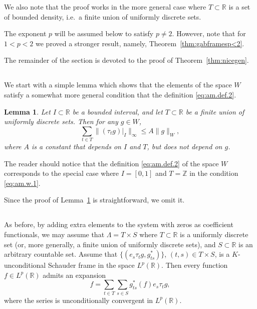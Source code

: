 \documentclass[reqno,a4paper,12pt]{amsart}
\numberwithin{equation}{section}
\numberwithin{figure}{section}
\newcommand\R{\mathbb{R}}
\newcommand\Z{\mathbb{Z}}
\newcommand\1{\mathds{1}}
\newcommand{\TTT}{T}
\newcommand{\SSS}{S}
\newcommand{\ts}{\tau}
\renewcommand\le{\leqslant}
\newcommand\sbt{\subset}
\theoremstyle{plain}
\newtheorem{lem}[thm]{Lemma}
\newcommand{\thmref}[1]{Theorem~\ref{#1}}
\newcommand{\lemref}[1]{Lemma~\ref{#1}}
\theoremstyle{definition}
\begin{document}
We also note that the proof works in the more general case where 
$\TTT \sbt \R$ is a set of bounded density, i.e.\ a finite union of uniformly discrete sets.

The exponent $p$ will be assumed below to satisfy $p \ne 2$. 
However, note that for $1<p<2$ we proved a stronger
result, namely, \thmref{thm:gabframesp<2}. 


The remainder of the section is devoted to the proof of \thmref{thm:nicegen}.




\subsection{}
We start with a simple lemma which shows that the
elements of the space $W$ satisfy a somewhat more general
condition that the definition \eqref{eq:am.def.2}.


\begin{lem}
\label{lem:amalgam}
Let $I \subset \R$ be a bounded interval, 
and let $\TTT\subset\R$ be a finite union of uniformly discrete sets.
Then for any  $g \in W$, 
\begin{equation}
\label{eq:am.w.1}
\sum_{t\in \TTT} \|(\ts_tg)|_{I}\|_{\infty} \le A \|g\|_W,
\end{equation}
where $A$ is a constant that depends on $I$ and $\TTT$,
but does not depend on $g$.
\end{lem} 

The reader should notice that the definition 
\eqref{eq:am.def.2} of the space $W$ corresponds to
the special case  where $I = [0,1]$ and $\TTT = \Z$
in the condition \eqref{eq:am.w.1}.

Since the proof of \lemref{lem:amalgam} is straightforward, we omit it.



\subsection{}
As before, by adding extra elements to the system 
with zeros as coefficient functionals,
we may assume that $\Lambda = \TTT \times \SSS$ 
where $\TTT\subset\R$ is a  uniformly discrete set (or, more generally, a finite union of uniformly discrete sets), and $\SSS\subset\R$ is an arbitrary countable set.
Assume that $\{(e_s \ts_tg, g_{ts}^*)\}$,
$(t,s) \in \TTT \times  \SSS$, is a $K$-unconditional Schauder frame in the
space $L^p(\R)$. Then every function $f\in L^p(\R)$ admits an expansion
\begin{equation}
\label{eq:f.ex.bl}
f = \sum_{t\in \TTT} \sum_{s\in \SSS} g_{ts}^*(f) e_s \ts_t g,
\end{equation}
where the series is unconditionally convergent in $L^p(\R)$.
\end{document}
